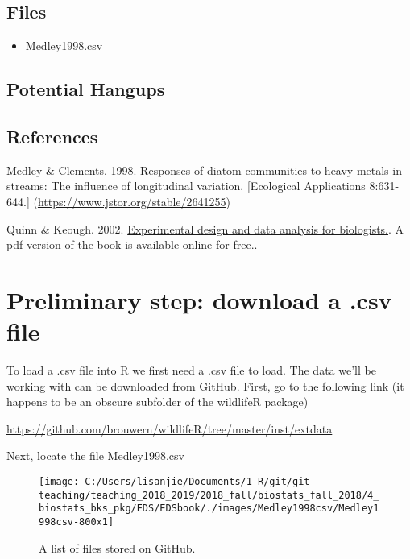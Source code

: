 \documentclass[]{book}
\providecommand{\tightlist}{%
  \setlength{\itemsep}{0pt}\setlength{\parskip}{0pt}}
\theoremstyle{definition}
\theoremstyle{definition}
\theoremstyle{definition}
\theoremstyle{remark}
\begin{document}
\subsection{Files}\label{files}

\begin{itemize}
\tightlist
\item
  Medley1998.csv
\end{itemize}

\subsection{Potential Hangups}\label{potential-hangups-3}

\subsection{References}\label{references}

Medley \& Clements. 1998. Responses of diatom communities to heavy
metals in streams: The influence of longitudinal variation.
{[}Ecological Applications 8:631-644.{]}
(\url{https://www.jstor.org/stable/2641255})

Quinn \& Keough. 2002.
\href{http://www.cambridge.org/us/academic/subjects/life-sciences/ecology-and-conservation/experimental-design-and-data-analysis-biologists?format=PB\&isbn=9780521009768\#1HKJ7hG4zeY15ipR.97}{Experimental
design and data analysis for biologists.}. A pdf version of the book is
available online for free..

\section{Preliminary step: download a .csv
file}\label{preliminary-step-download-a-.csv-file}

To load a .csv file into R we first need a .csv file to load. The data
we'll be working with can be downloaded from GitHub. First, go to the
following link (it happens to be an obscure subfolder of the wildlifeR
package)

\url{https://github.com/brouwern/wildlifeR/tree/master/inst/extdata}

Next, locate the file Medley1998.csv

\begin{figure}
\texttt{[image: C:/Users/lisanjie/Documents/1\_R/git/git-teaching/teaching\_2018\_2019/2018\_fall/biostats\_fall\_2018/4\_biostats\_bks\_pkg/EDS/EDSbook/./images/Medley1998csv/Medley1998csv-800x1]} \caption{A list of files stored on GitHub.}\label{fig:unnamed-chunk-90}
\end{figure}
\end{document}
